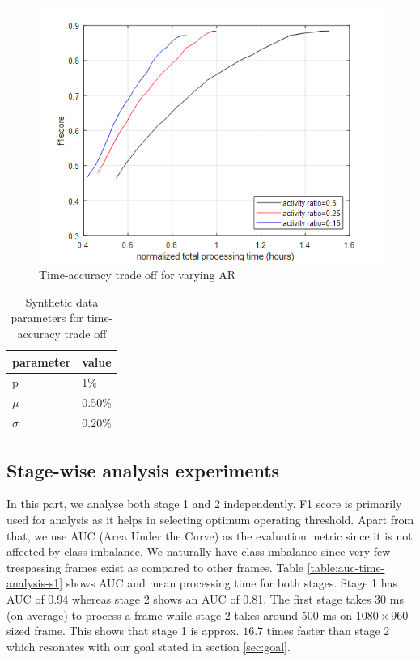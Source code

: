 \begin{figure}
    \centering
    \includegraphics[width=\linewidth]{images/time-acc-tradeoff-ar-mog.png}
    \caption{Time-accuracy trade off for varying AR}
    \label{fig:time-acc-tradeoff-ar-mog}
\end{figure}

\begin{table}
\centering
\caption{Synthetic data parameters for time-accuracy trade off} \vspace{5pt}
\label{table:fig1_data_params}
\begin{tabular}{|l|l|}
\hline
parameter             & value  \\ \hline \hline
p                     & 1\%    \\ 
$\mu$    & 0.50\% \\ 
$\sigma$ & 0.20\% \\ \hline
\end{tabular}
\end{table}

\subsection{Stage-wise analysis experiments}
In this part, we analyse both stage 1 and 2 independently. F1 score is primarily used for analysis as it helps in selecting optimum operating threshold. Apart from that, we use AUC (Area Under the Curve) as the evaluation metric since it is not affected by class imbalance. We naturally have class imbalance since very few trespassing frames exist as compared to other frames. Table \ref{table:auc-time-analysis-s1} shows AUC and mean processing time for both stages. Stage 1 has AUC of 0.94 whereas stage 2 shows an AUC of 0.81. The first stage takes 30 ms  (on average) to process a frame while stage 2 takes around 500 ms on $1080 \times 960$ sized frame. This shows that stage 1 is approx. $16.7$ times faster than stage 2 which resonates with our goal stated in section \ref{sec:goal}. 

